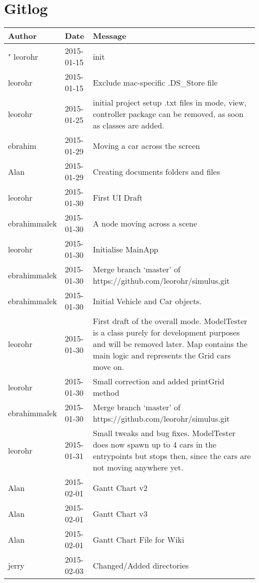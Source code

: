 \chapter{Gitlog}
\begin{center}
\begin{longtabu} to \textwidth {|
    X[4,l]|
    X[3,c]|
    X[8,l]|}
    \hline
    \textbf{Author} & \textbf{Date} & \textbf{Message} \\ \hline"
leorohr & 2015-01-15 & init \\ \hline
leorohr & 2015-01-15 & Exclude mac-specific .DS\_Store file \\ \hline
leorohr & 2015-01-25 & initial project setup .txt files in mode, view, controller package can be removed, as soon as classes are added. \\ \hline
ebrahim & 2015-01-29 & Moving a car across the screen \\ \hline
Alan & 2015-01-29 & Creating documents folders and files \\ \hline
leorohr & 2015-01-30 & First UI Draft \\ \hline
ebrahimmalek & 2015-01-30 & A node moving across a scene \\ \hline
leorohr & 2015-01-30 & Initialise MainApp \\ \hline
ebrahimmalek & 2015-01-30 & Merge branch `master' of https://github.com/leorohr/simulus.git \\ \hline
ebrahimmalek & 2015-01-30 & Initial Vehicle and Car objects. \\ \hline
leorohr & 2015-01-30 & First draft of the overall mode. ModelTester is a class purely for development purposes and will be removed later. Map contains the main logic and represents the Grid cars move on. \\ \hline
leorohr & 2015-01-30 & Small correction and added printGrid method \\ \hline
ebrahimmalek & 2015-01-30 & Merge branch `master' of https://github.com/leorohr/simulus.git \\ \hline
leorohr & 2015-01-31 & Small tweaks and bug fixes. ModelTester does now spawn up to 4 cars in the entrypoints but stops then, since the cars are not moving anywhere yet. \\ \hline
Alan & 2015-02-01 & Gantt Chart v2 \\ \hline
Alan & 2015-02-01 & Gantt Chart v3 \\ \hline
Alan & 2015-02-01 & Gantt Chart File for Wiki \\ \hline
jerry & 2015-02-03 & Changed/Added directories \\ \hline

\end{longtabu}
\end{center}
